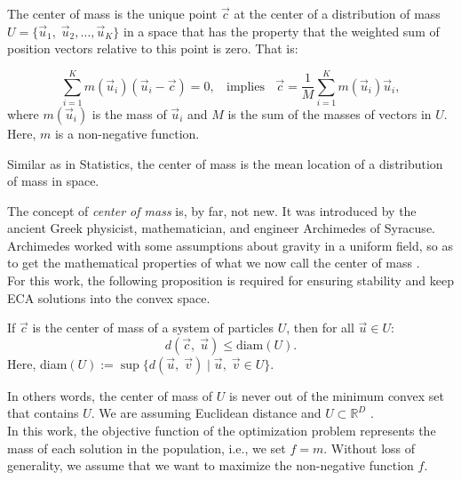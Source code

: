 \documentclass{svproc}
\begin{document}
\begin{definition}
	The center of mass is the unique point $\vec{c}$ at the center of a distribution
	of mass $U = \{\vec{u}_1,\; \vec{u}_2 , \ldots , \vec{u}_K \}$ in a space that 
	has the property that the weighted sum of position vectors relative to this point 
	is zero. That is:

	\begin{equation}
		\sum_{i = 1}^K m(\vec{u}_i) (\vec{u}_i - \vec{c}) = 0, \;\; \text{ implies } \;\; 
		\vec{c} = \dfrac{1}{M} \sum_{i = 1}^K  m(\vec{u}_i)  \vec{u}_i,
		\label{eq:masscenter}
	\end{equation}
	where $m(\vec{u}_i)$ is the mass of $\vec{u}_i$ and  $M$ is the sum of the 
	masses of vectors in $U$. Here, $m$ is a non-negative function.
\end{definition}
%
%
\begin{note}
Similar as in Statistics, the center of mass is the mean location of a distribution 
of mass in space.
\end{note}
% 
The concept of \textit{center of mass} is, by far, not new. It was introduced by the ancient 
Greek physicist, mathematician, and engineer Archimedes of Syracuse. Archimedes 
worked with some assumptions about gravity in a uniform field, so as to 
get the mathematical properties of what we now call the center of mass \cite{kleppner73}.\\

For this work, the following proposition is required for ensuring stability and keep ECA 
solutions into the convex space.

\begin{proposition}
	If $\vec{c}$ is the center of mass of a system of particles $U$, 
	then  for all $ \vec{u}\in U $:
	$$  d(\vec{c},\; \vec{u} )  \leq \text{diam}(U). $$
	Here, diam$(U) := \sup\{ d(\vec{u},\; \vec{v} ) \; | \; \vec{u} ,\; \vec{v} \in U \}$.
\end{proposition}
%
\noindent
In others words, the center of mass of $U$ is never out of the minimum convex set that 
contains $U$. We are assuming Euclidean distance and $U \subset \mathbb{R}^D$ \cite{rudin}.\\

%
% 
%

In this work, the objective function of the optimization problem represents 
the mass of each solution in the population,  i.e., we set $f = m$. 
Without loss of generality, we assume that we want to maximize 
the non-negative function $f$.
\end{document}
